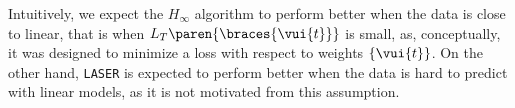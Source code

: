 Intuitively, we expect the $H_\infty$ algorithm to perform better when
the data is close to linear, that is when
$L_T\paren{\braces{\vui{t}}}$ is small, as, conceptually, it was
designed to minimize a loss with respect to weights $\{\vui{t}\}$.  On
the other hand, \texttt{LASER} is expected to perform better when the data is
hard to predict with linear models, as it is not motivated from this
assumption.
%
